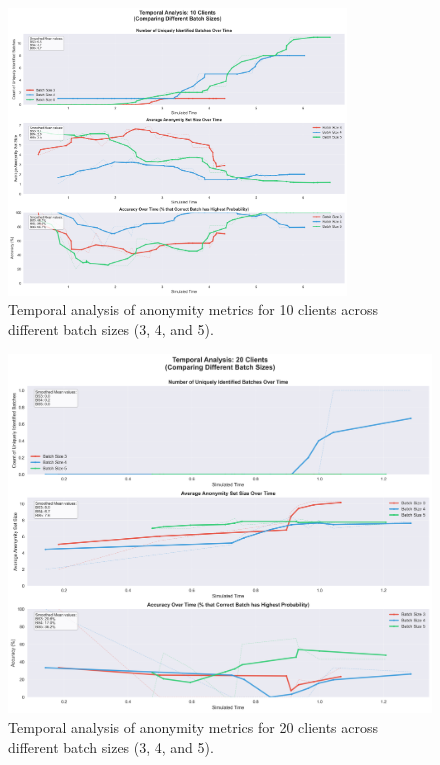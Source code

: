 \documentclass{article}
\begin{document}
\begin{figure}
\centering
\includegraphics[width=0.8\textwidth]{diagrams/temporal_5_smoothed_10_clients.png}
\caption{Temporal analysis of anonymity metrics for 10 clients across different batch sizes (3, 4, and 5).}
\label{fig:temporal_analysis_10}
\end{figure}

\begin{figure}
\centering
\includegraphics[width=\textwidth]{diagrams/temporal_5_smoothed_20_clients.png}
\caption{Temporal analysis of anonymity metrics for 20 clients across different batch sizes (3, 4, and 5).}
\label{fig:temporal_analysis_20}
\end{figure}
\end{document}
